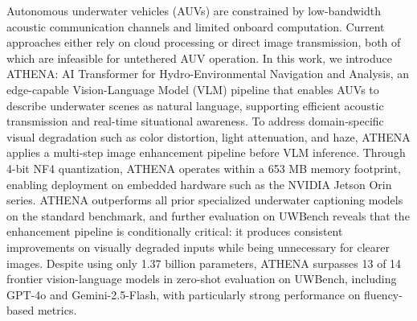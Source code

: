 
Autonomous underwater vehicles (AUVs) are constrained by low-bandwidth acoustic
communication channels and limited onboard computation. Current approaches
either rely on cloud processing or direct image transmission, both of which are
infeasible for untethered AUV operation. In this work, we introduce ATHENA: AI
Transformer for Hydro-Environmental Navigation and Analysis, an edge-capable
Vision-Language Model (VLM) pipeline that enables AUVs to describe underwater
scenes as natural language, supporting efficient acoustic transmission and
real-time situational awareness. To address domain-specific visual degradation
such as color distortion, light attenuation, and haze, ATHENA applies a
multi-step image enhancement pipeline before VLM inference. Through 4-bit NF4
quantization, ATHENA operates within a 653 MB memory footprint, enabling
deployment on embedded hardware such as the NVIDIA Jetson Orin series. ATHENA
outperforms all prior specialized underwater captioning models on the standard
benchmark, and further evaluation on UWBench reveals that the enhancement
pipeline is conditionally critical: it produces consistent improvements on
visually degraded inputs while being unnecessary for clearer images. Despite
using only 1.37 billion parameters, ATHENA surpasses 13 of 14 frontier
vision-language models in zero-shot evaluation on UWBench, including GPT-4o and
Gemini-2.5-Flash, with particularly strong performance on fluency-based metrics.

